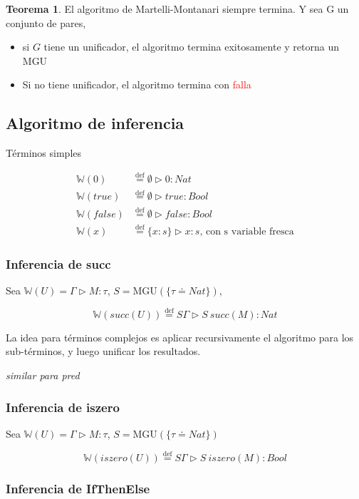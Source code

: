 \documentclass{report}
\theoremstyle{definition} %
\newtheorem{theorem}{Teorema}[chapter]
\newcommand{\eqdef}{\overset{\text{def}}{=}}
\newcommand{\tipa}[3]{#1 \rhd #2 : #3} %
\newcommand{\Gtipa}[2]{\tipa{\Gamma}{#1}{#2}}
\newcommand{\suc}[1]{succ(#1)}
\newcommand{\iszero}[1]{iszero(#1)}
\newcommand{\changed}[1]{\textcolor{red}{#1}}
\newcommand{\tsust}[1]{S#1} %
\newcommand{\infer}[1]{\mathbb{W}(#1)}
\newcommand{\tcontextOne}[2]{\{ #1 : #2 \}} %
\newcommand{\etipa}[2]{\tipa{\emptyset}{#1}{#2}} %
\newcommand{\unify}[2]{#1 \doteq #2}
\newcommand{\mgu}[2]{\text{MGU}(\{ \unify{#1}{#2} \})}
\begin{document}
\begin{theorem}
    El algoritmo de Martelli-Montanari siempre termina. Y sea G un conjunto de
    pares,
    
    \begin{itemize}
        \item si $G$ tiene un unificador, el algoritmo termina exitosamente y
        retorna un MGU
        \item Si no tiene unificador, el algoritmo termina con \changed{falla}
    \end{itemize} 
\end{theorem}

\subsection{Algoritmo de inferencia}

Términos simples

\begin{align*}
    \infer{0} &\eqdef \etipa{0}{Nat}\\
    \infer{true} &\eqdef \etipa{true}{Bool}\\
    \infer{false} &\eqdef \etipa{false}{Bool}\\
    \infer{x} &\eqdef \tipa{\tcontextOne{x}{s}}{x}{s}
    \text{, con s variable fresca}
\end{align*}

\subsubsection{Inferencia de succ}

Sea $\infer{U} = \Gtipa{M}{\tau}$, $S = \mgu{\tau}{Nat}$,

$$\infer{\suc{U}} \eqdef \tipa{\tsust{\Gamma}}{\tsust{\ \suc{M}}}{Nat}$$

La idea para términos complejos es aplicar recursivamente el algoritmo para los
sub-términos, y luego unificar los resultados.

\textit{similar para pred}

\subsubsection{Inferencia de iszero}

Sea $\infer{U} = \Gtipa{M}{\tau}$, $S = \mgu{\tau}{Nat}$

$$\infer{\iszero{U}} \eqdef \tipa{\tsust{\Gamma}}{\tsust{\ \iszero{M}}}{Bool}$$

\subsubsection{Inferencia de IfThenElse}
\end{document}
